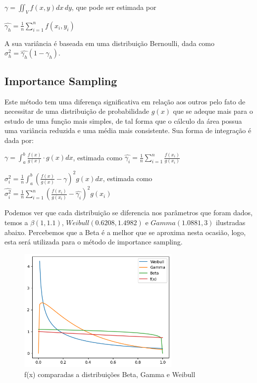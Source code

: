 \documentclass[a4paper]{article}
\begin{document}
\begin{center}

$\gamma =  \iint_V f(x,y)dx\,dy$, que pode ser estimada por

\vspace{0.5cm}

$\hat{\gamma_{h}} = \frac{1}{n}\sum_{i = 1}^{n} f(x_{i}, y_{i}) $

\end{center}

A sua variância é baseada em uma distribuição Bernoulli, dada como $\sigma_{h}^2 = \hat{\gamma_{h}}(1-\hat{\gamma_{h}})$.

\subsection{Importance Sampling}

Este método tem uma diferença significativa em relação aos outros pelo fato de necessitar de uma distribuição de probabilidade $g(x)$ que se adeque mais para o estudo de uma função mais simples, de tal forma que o cálculo da área possua uma variância reduzida e uma média mais consistente. Sua forma de integração é dada por:

\begin{center}

$\gamma = \int_{a}^{b} \frac{f(x)}{g(x)}\cdot g(x) dx$, estimada como $\hat{\gamma_{i}} = \frac{1}{n}\sum_{i = 1}^{n} \frac{f(x_{i})}{g(x_i)} $

\vspace{0.5cm}

$\sigma_{i}^{2} = \frac{1}{n}\int_{a}^{b} (\frac{f(x)}{g(x)} - \gamma)^{2}g(x) dx$, estimada como $\hat{\sigma_{i}^{2}} = \frac{1}{n}\sum_{i=1}^{n} (\frac{f(x_i)}{g(x_i)}-\hat{\gamma_{i}})^2g(x_i)$

\end{center}

Podemos ver que cada distribuição se diferencia nos parâmetros que foram dados, temos a $\beta(1 , 1.1)$, $Weibull(0.6208, 1.4982)$ e $Gamma(1.0881, 3)$ ilustradas abaixo. Percebemos que a Beta é a melhor que se aproxima nesta ocasião, logo, esta será utilizada para o método de importance sampling.

\begin{figure}[H]
  \centering
  \includegraphics[width=0.7\textwidth]{Distribuições.png}
  \caption{f(x) comparadas a distribuições Beta, Gamma e Weibull}
  \label{fig:circulo}
\end{figure}
\end{document}
